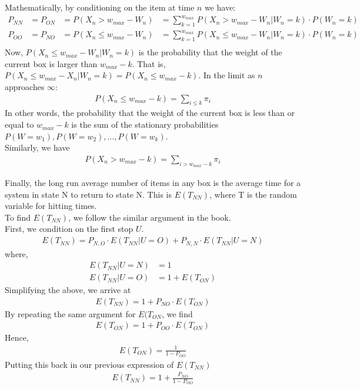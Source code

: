 \documentclass[10pt,a4paper]{article}
\begin{document}
Mathematically, by conditioning on the item at time $ n $ we have:\\
\begin{align*}
P_{NN} &= P_{ON} &= P(X_n > w_{max} -W_n) &= \sum\limits_{k=1}^{w_{max}} P(X_n > w_{max} -W_n | W_n=k)\cdot P(W_n=k)  \\
P_{OO} &= P_{NO} &= P(X_n \leq w_{max} -W_n) &=\sum\limits_{k=1}^{w_{max}} P(X_n \leq w_{max} -W_n | W_n=k)\cdot P(W_n=k) \\
\end{align*}
Now, $ P(X_n \leq w_{max} -W_n | W_n=k) $ is the probability that the weight of the current box is larger than $ w_{max} - k $. That is, $ P(X_n \leq w_{max} -X_n | W_n=k) = P(X_n \leq w_{max} -k)$. In the limit as $ n $ approaches $ \infty $:\\
\begin{align*}
P(X_n \leq w_{max} -k)= \sum_{i \leq k} \pi_i
\end{align*}
In other words, the probability that the weight of the current box is less than or equal to $ w_{max} - k $ is the sum of the stationary probabilities  $ P(W=w_1),P(W=w_2),...,P(W=w_k) $.\\
Similarly, we have \\
\begin{align*}
P(X_n > w_{max}-k)= \sum_{i > w_{max} -k} \pi_i 
\end{align*}



Finally, the long run average number of items in any box is the average time for a system in state N to return to state N. This is $ E(T_{NN}) $, where T is the random variable for hitting times. \\
To find $ E(T_{NN}) $, we follow the similar argument in the book. \\
First, we condition on the first stop $ U $. 
\begin{align*}
E(T_{NN}) = P_{N,O}\cdot E(T_{NN}|U=O)+P_{N,N}\cdot E(T_{NN}|U=N)
\end{align*}
where,\\
\begin{align*}
E(T_{NN}|U=N) &= 1 \\
E(T_{NN}|U=O) &= 1+E(T_{ON})
\end{align*}
Simplifying the above, we arrive at\\
\begin{align*}
E(T_{NN}) = 1+ P_{NO}\cdot E(T_{ON})
\end{align*}
By repeating the same argument for $ E(T_{ON} $, we find \\
\begin{align*}
E(T_{ON}) = 1+ P_{OO}\cdot E(T_{ON})
\end{align*}
Hence, 
\begin{align*}
E(T_{ON}) = \frac{1}{1 - P_{OO}}
\end{align*}
Putting this back in our previous expression of $ E(T_{NN}) $
\begin{align*}
E(T_{NN}) = 1+ \frac{P_{NO}}{1 - P_{OO}}
\end{align*}
\end{document}
